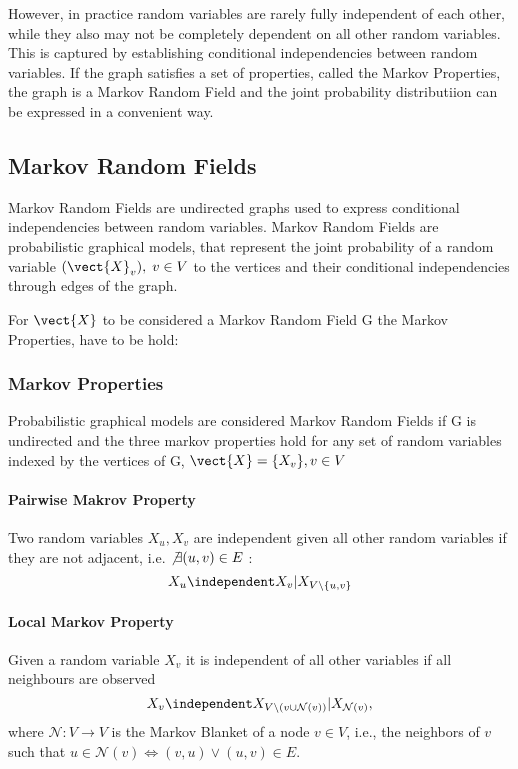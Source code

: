 However, in practice random variables are rarely fully independent of each other, while they also may not be completely dependent on all other random variables.
This is captured by establishing conditional independencies between random variables.
If the graph satisfies a set of properties, called the Markov Properties, the graph is a Markov Random Field and the joint probability distributiion can be expressed in a convenient way.

\subsection{Markov Random Fields}
Markov Random Fields are undirected graphs used to express conditional independencies between random variables. 
Markov Random Fields are probabilistic graphical models, that represent the joint probability of a random variable $(\vect{X}_v), \; v \in V$ \wrt to the vertices and their conditional independencies through edges of the graph. 

For $\vect{X}$ to be considered a Markov Random Field \wrt G the Markov Properties, have to be hold:

\subsubsection*{Markov Properties}
Probabilistic graphical models are considered Markov Random Fields if G is undirected and the three markov properties hold for any set of random variables indexed by the vertices of G, $\vect{X} = \{X_v\}, v \in V$

\paragraph*{Pairwise Makrov Property}
Two random variables $X_u, X_v$ are independent given all other random variables if they are not adjacent, i.e. $\not\exists (u,v) \in E$ :
\begin{equation}
    X_u \independent X_v \lvert X_{V \setminus\{u,v\}}
\end{equation}

\paragraph*{Local Markov Property}
Given a random variable $X_v$ it is independent of all other variables if all neighbours are observed 
\begin{equation}
    X_v \independent X_{V\setminus (v \cup \mathcal{N}(v))} \lvert X_{\mathcal{N}(v)},   
\end{equation}
where $\mathcal{N}: V \rightarrow V$ is the Markov Blanket of a node $v \in V$, i.e., the neighbors of $v$ such that $u \in \mathcal{N}(v) \Leftrightarrow (v,u) \vee (u,v) \in E$.

